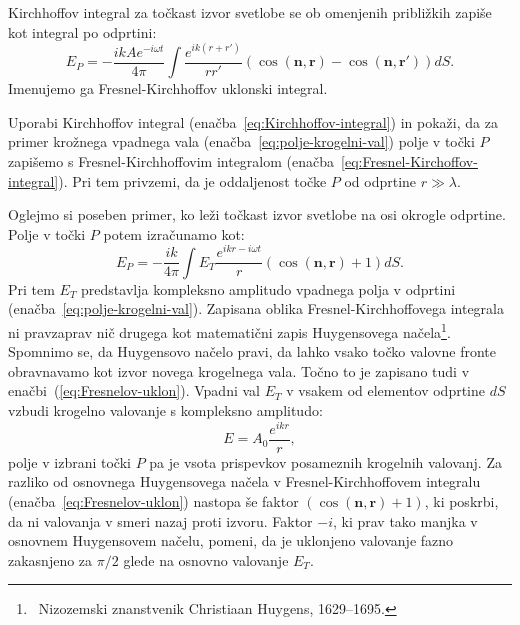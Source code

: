 Kirchhoffov integral za točkast izvor svetlobe se ob omenjenih približkih
zapiše kot integral po odprtini:
\begin{equation}
E_P = -\frac{ik A e^{-i\omega t}}{4\pi}\int\frac{e^{ik(r+r')}}{rr'}\left(\cos(\mathbf{n},
\mathbf{r})-\cos(\mathbf{n},\mathbf{r'})\right) dS.
\label{eq:Fresnel-Kirchoffov-integral}
\end{equation}
Imenujemo ga Fresnel-Kirchhoffov uklonski integral.
\begin{naloga}
\label{naloga-Fresnel-Kirchhoff-uklon}
Uporabi Kirchhoffov integral (enačba~\ref{eq:Kirchhoffov-integral}) in pokaži, da 
za primer krožnega vpadnega vala (enačba~\ref{eq:polje-krogelni-val}) polje v točki 
$P$ zapišemo s Fresnel-Kirchhoffovim integralom (enačba~\ref{eq:Fresnel-Kirchoffov-integral}). 
Pri tem privzemi, da je oddaljenost točke $P$ od odprtine $r \gg \lambda$.
\end{naloga}

Oglejmo si poseben primer, ko leži točkast izvor svetlobe na osi okrogle odprtine. Polje 
v točki $P$ potem izračunamo kot:
\begin{equation}
\label{eq:Fresnelov-uklon}
E_P =  -\frac{ik}{4\pi} \int E_T\frac{ e^{ikr-i\omega t}}{r}\left(\cos(\mathbf{n},\mathbf{r})+1\right) dS.
\end{equation}
Pri tem $E_T$ predstavlja kompleksno amplitudo vpadnega polja v odprtini (enačba~\ref{eq:polje-krogelni-val}). 
Zapisana oblika Fresnel-Kirchhoffovega integrala ni pravzaprav nič drugega kot 
matematični zapis Huygensovega 
načela\footnote{~Nizozemski znanstvenik Christiaan Huygens, 1629--1695.}. 
Spomnimo se, da Huygensovo načelo pravi, da lahko vsako točko valovne fronte obravnavamo 
kot izvor novega krogelnega vala. Točno to je zapisano tudi v enačbi~(\ref{eq:Fresnelov-uklon}). 
Vpadni val
$E_T$ v vsakem od elementov odprtine $dS$ vzbudi krogelno valovanje s
kompleksno amplitudo:
\begin{equation}
E = A_0 \frac{e^{ikr}}{r},
\end{equation} 
polje v izbrani točki $P$ pa je vsota prispevkov posameznih krogelnih valovanj.
Za razliko od osnovnega Huygensovega načela v Fresnel-Kirchhoffovem integralu 
(enačba~\ref{eq:Fresnelov-uklon})
nastopa še faktor $\left(\cos(\mathbf{n},\mathbf{r})+1\right)$, ki poskrbi, da ni valovanja 
v smeri nazaj proti izvoru. Faktor $-i$, 
ki prav tako manjka v osnovnem Huygensovem načelu,
pomeni, da je uklonjeno valovanje fazno zakasnjeno za $\pi/2$ glede na osnovno
valovanje $E_T$.

